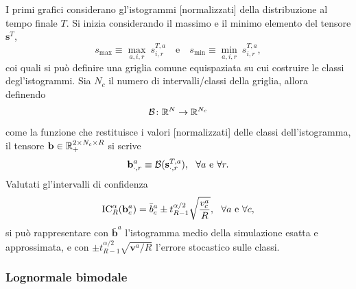         I primi grafici considerano gl'istogrammi [normalizzati] della distribuzione al tempo finale \(T\). Si inizia considerando il massimo e il minimo elemento del tensore \(\mathbf s^T\),
        \begin{equation*}
          s_{\max}\equiv\max_{a,i,r}\ s^{T,a}_{i,r}
          \quad\text{e}\quad
          s_{\min}\equiv\min_{a,i,r}\ s^{T,a}_{i,r},
        \end{equation*}
        coi quali si può definire una griglia comune equispaziata su cui costruire le classi degl'istogrammi. Sia \(N_c\) il numero di intervalli/classi della griglia, allora definendo \[\operatorname{\mathcal B}\colon\mathbb R^N\to\mathbb R^{N_c}\] come la funzione che restituisce i valori [normalizzati] delle classi dell'istogramma, il tensore \(\mathbf b\in\mathbb R_+^{2\times N_c\times R}\) si scrive
        \begin{equation}
          \label{eqAltezzeIstogrammi}
          \mathbf b^a_{\cdot,r}\equiv\operatorname{\mathcal B}(\mathbf s^{T,a}_{\cdot,r}),
          \ \ \forall a\text{ e }\forall r.
        \end{equation}
        Valutati gl'intervalli di confidenza
        \begin{equation*}
          \operatorname{IC}_R^\alpha(\mathbf b^a_c)=
          \bar b^a_c\pm t^{\alpha/2}_{R-1}\sqrt{\frac{v^a_c}R},
          \ \ \forall a\text{ e }\forall c,
        \end{equation*}
        si può rappresentare con \(\bar{\mathbf b}^a\) l'istogramma medio della simulazione esatta e approssimata, e con \(\pm t^{\alpha/2}_{R-1}\sqrt{\mathbf v^a/R}\) l'errore stocastico sulle classi.%

      \subsubsection{Lognormale bimodale}

